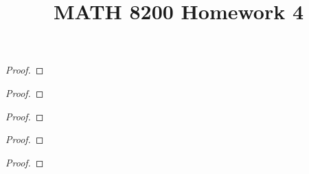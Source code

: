 \documentclass[12pt]{article}
\newenvironment{statement}[2][Statement]{\begin{trivlist}
\item[\hskip \labelsep {\bfseries #1}\hskip \labelsep {\bfseries #2.}]}{\end{trivlist}}
\begin{document}
 
\title{MATH 8200 Homework 4} 
\author{}
\maketitle

\begin{statement}[Problem]{1}

\end{statement}
\begin{proof}

\end{proof}

\begin{statement}[Problem]{2}

\end{statement}
\begin{proof}

\end{proof}

\begin{statement}[Problem]{3}

\end{statement}
\begin{proof}

\end{proof}

\begin{statement}[Problem]{4}

\end{statement}
\begin{proof}

\end{proof}

\begin{statement}[Problem]{5}

\end{statement}
\begin{proof}

\end{proof}
\end{document}
